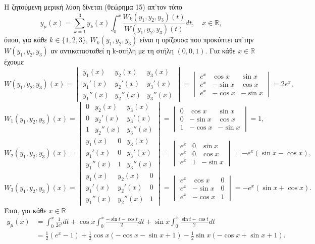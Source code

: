\documentclass[11pt,a4paper,twoside]{book}
\begin{document}
Η ζητούμενη μερική λύση δίνεται (θεώρημα 15) απ'τον τύπο
\[
    y_\mu(x) = \sum_{k=1}^3 y_k(x) \int_0^x \frac{W_k(y_1,y_2,y_3)(t)}{W(y_1,y_2,y_3)(t)} dt, \quad x\in\mathbb{R},
\]
όπου, για κάθε $k\in\{1,2,3\}$, $W_k(y_1,y_2,y_3)$ είναι η ορίζουσα που προκύπτει απ'την $W(y_1,y_2,y_3)$ αν αντικατασταθεί η k-στήλη με τη στήλη $(0,0,1)$. Για κάθε $x\in\mathbb{R}$ έχουμε
\[
    W(y_1,y_2,y_3)(x) = \begin{vmatrix} y_1(x) & y_2(x) & y_3(x) \\ y_1'(x) & y_2'(x) & y_3'(x) \\ y_1''(x) & y_2''(x) & y_3''(x) \end{vmatrix}
    = \begin{vmatrix} e^x & \cos x & \sin x \\ e^x & -\sin x & \cos x \\ e^x & -\cos x & -\sin x \end{vmatrix} = 2e^x,
\]
\[
    W_1(y_1,y_2,y_3)(x) = \begin{vmatrix} 0 & y_2(x) & y_3(x) \\ 0 & y_2'(x) & y_3'(x) \\ 1 & y_2''(x) & y_3''(x) \end{vmatrix}
    = \begin{vmatrix} 0 & \cos x & \sin x \\ 0 & -\sin x & \cos x \\ 1 & -\cos x & -\sin x \end{vmatrix} = 1,
\]
\[
    W_2(y_1,y_2,y_3)(x) = \begin{vmatrix} y_1(x) & 0 & y_3(x) \\ y_1'(x) & 0 & y_3'(x) \\ y_1''(x) & 1 & y_3''(x) \end{vmatrix}
    = \begin{vmatrix} e^x & 0 & \sin x \\ e^x & 0 & \cos x \\ e^x & 1 & -\sin x \end{vmatrix} = -e^x(\sin x - \cos x),
\]
\[
    W_3(y_1,y_2,y_3)(x) = \begin{vmatrix} y_1(x) & y_2(x) & 0 \\ y_1'(x) & y_2'(x) & 0 \\ y_1''(x) & y_2''(x) & 1 \end{vmatrix}
    = \begin{vmatrix} e^x & \cos x & 0 \\ e^x & -\sin x & 0 \\ e^x & -\cos x & 1 \end{vmatrix} = -e^x(\sin x + \cos x).
\]
Έτσι, για κάθε $x\in\mathbb{R}$
\begin{align*}
    y_\mu(x) &= \int_0^x \frac{1}{2e^t} dt + \cos x \int_0^x \frac{-\sin t - \cos t}{2} dt + \sin x \int_0^x \frac{\sin t - \cos t}{2} dt \\
    &= \frac{1}{2}(e^x-1) + \frac{1}{2} \cos x (-\cos x - \sin x + 1) - \frac{1}{2} \sin x(-\cos x + \sin x + 1).
\end{align*}
\end{document}
